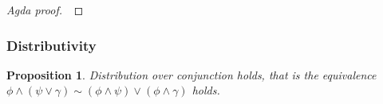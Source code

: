 \documentclass[titlepage]{article}
\newtheorem{proposition}{Proposition}
\begin{document}
\begin{proof}[Agda proof] $\:$
\end{proof}


\subsubsection{Distributivity}\label{dist-section}

\begin{proposition}\label{conj-dist}
    Distribution over conjunction holds, that is the equivalence $\phi \wedge (\psi \vee \gamma) \sim (\phi \wedge \psi) \vee (\phi \wedge \gamma)$ holds.
\end{proposition}
\end{document}
